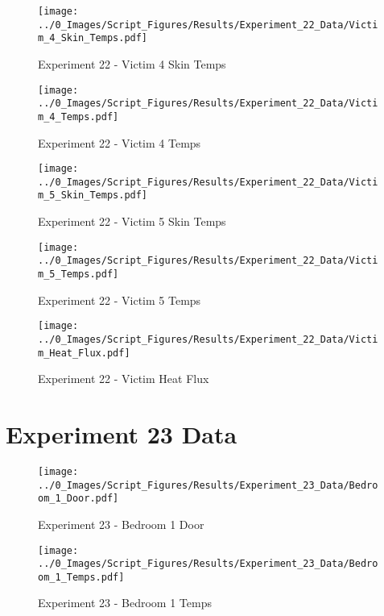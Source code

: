 	\begin{figure}[H]
		\centering
		\texttt{[image: ../0\_Images/Script\_Figures/Results/Experiment\_22\_Data/Victim\_4\_Skin\_Temps.pdf]}
		\caption[]{Experiment 22 - Victim 4 Skin Temps}
	\end{figure}
 
	\clearpage

	\begin{figure}[H]
		\centering
		\texttt{[image: ../0\_Images/Script\_Figures/Results/Experiment\_22\_Data/Victim\_4\_Temps.pdf]}
		\caption[]{Experiment 22 - Victim 4 Temps}
	\end{figure}
 

	\begin{figure}[H]
		\centering
		\texttt{[image: ../0\_Images/Script\_Figures/Results/Experiment\_22\_Data/Victim\_5\_Skin\_Temps.pdf]}
		\caption[]{Experiment 22 - Victim 5 Skin Temps}
	\end{figure}
 
	\clearpage

	\begin{figure}[H]
		\centering
		\texttt{[image: ../0\_Images/Script\_Figures/Results/Experiment\_22\_Data/Victim\_5\_Temps.pdf]}
		\caption[]{Experiment 22 - Victim 5 Temps}
	\end{figure}
 

	\begin{figure}[H]
		\centering
		\texttt{[image: ../0\_Images/Script\_Figures/Results/Experiment\_22\_Data/Victim\_Heat\_Flux.pdf]}
		\caption[]{Experiment 22 - Victim Heat Flux}
	\end{figure}
 
	\clearpage

\clearpage		\large
\section{Experiment 23 Data} \label{App:Exp23Results} 

	\begin{figure}[H]
		\centering
		\texttt{[image: ../0\_Images/Script\_Figures/Results/Experiment\_23\_Data/Bedroom\_1\_Door.pdf]}
		\caption[]{Experiment 23 - Bedroom 1 Door}
	\end{figure}
 

	\begin{figure}[H]
		\centering
		\texttt{[image: ../0\_Images/Script\_Figures/Results/Experiment\_23\_Data/Bedroom\_1\_Temps.pdf]}
		\caption[]{Experiment 23 - Bedroom 1 Temps}
	\end{figure}
 
